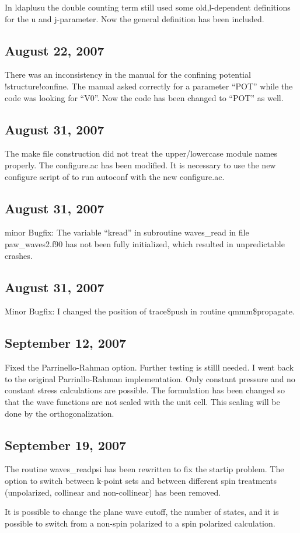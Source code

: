 \documentclass[final,12pt]{article}
\begin{document}
In ldaplusu the double counting term still used some old,l-dependent
definitions for the u and j-parameter. Now the general definition has
been included.

\subsection{August 22,  2007}

There was an inconsistency in the manual for the confining potential
!structure!confine. The manual asked correctly for a parameter ``POT''
while the code was looking for ``V0''. Now the code has been changed
to ``POT'' as well.

\subsection{August 31,  2007}

The make file construction did not treat the upper/lowercase module
names properly. The configure.ac has been modified. It is necessary to
use the new configure script of to run autoconf with the new
configure.ac.

\subsection{August 31,  2007}

minor Bugfix: The variable ``kread'' in subroutine waves_read in file
paw_waves2.f90 has not been fully initialized, which resulted in
unpredictable crashes.

\subsection{August 31,  2007}

Minor Bugfix: I changed the position of trace\$push in routine
qmmm\$propagate. 

\subsection{September 12,  2007}

Fixed the Parrinello-Rahman option. Further testing is stilll needed. I
went back to the original Parrinllo-Rahman implementation.  Only
constant pressure and no constant stress calculations are possible.
The formulation has been changed so that the wave functions are not
scaled with the unit cell.  This scaling will be done by the
orthogonalization.

\subsection{September 19,  2007}

The routine waves_readpsi has been rewritten to fix the startip
problem.  The option to switch between k-point sets and between
different spin treatments (unpolarized, collinear and non-collinear)
has been removed.

It is possible to change the plane wave cutoff, the number of states,
and it is possible to switch from a non-spin polarized to a spin
polarized calculation.


\newpage


\end{document}
